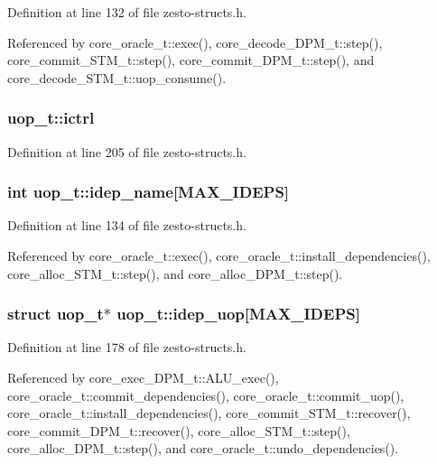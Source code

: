 Definition at line 132 of file zesto-structs.h.

Referenced by core\_\-oracle\_\-t::exec(), core\_\-decode\_\-DPM\_\-t::step(), core\_\-commit\_\-STM\_\-t::step(), core\_\-commit\_\-DPM\_\-t::step(), and core\_\-decode\_\-STM\_\-t::uop\_\-consume().
\subsubsection[{ictrl}]{ {\bf uop\_\-t::ictrl}}\label{structuop__t_addb67597e98f3fffa501153ca2255d1}




Definition at line 205 of file zesto-structs.h.
\subsubsection[{idep\_\-name}]{\setlength{\rightskip}{0pt plus 5cm}int {\bf uop\_\-t::idep\_\-name}[MAX\_\-IDEPS]}\label{structuop__t_802d55251c30f553d17da8dc7502ad62}




Definition at line 134 of file zesto-structs.h.

Referenced by core\_\-oracle\_\-t::exec(), core\_\-oracle\_\-t::install\_\-dependencies(), core\_\-alloc\_\-STM\_\-t::step(), and core\_\-alloc\_\-DPM\_\-t::step().
\subsubsection[{idep\_\-uop}]{\setlength{\rightskip}{0pt plus 5cm}struct {\bf uop\_\-t}$\ast$ {\bf uop\_\-t::idep\_\-uop}[MAX\_\-IDEPS]\hspace{0.3cm}{\tt  [read]}}\label{structuop__t_e941cb97551b1b6f4205334d2c23fbc4}




Definition at line 178 of file zesto-structs.h.

Referenced by core\_\-exec\_\-DPM\_\-t::ALU\_\-exec(), core\_\-oracle\_\-t::commit\_\-dependencies(), core\_\-oracle\_\-t::commit\_\-uop(), core\_\-oracle\_\-t::install\_\-dependencies(), core\_\-commit\_\-STM\_\-t::recover(), core\_\-commit\_\-DPM\_\-t::recover(), core\_\-alloc\_\-STM\_\-t::step(), core\_\-alloc\_\-DPM\_\-t::step(), and core\_\-oracle\_\-t::undo\_\-dependencies().
